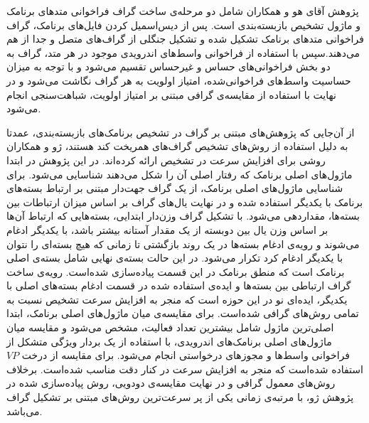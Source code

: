 پژوهش آقای هو و همکاران شامل دو مرحله‌ی ساخت گراف فراخوانی متد‌های‌ برنامک و ماژول تشخیص بازبسته‌بندی است. پس از دیس‌اسمیل کردن فایل‌های برنامک، گراف فراخوانی متد‌های برنامک تشکیل شده و تشکیل جنگلی از گراف‌های متصل و جدا از هم می‌دهند.سپس با استفاده از فراخوانی‌ واسط‌های اندرویدی موجود در هر متد، گراف به دو بخش فراخوانی‌های حساس‌ و غیرحساس‌ تقسیم می‌شود و با توجه به میزان حساسیت واسط‌های فراخوانی‌شده، امتیاز اولویت‌ به هر گراف نگاشت می‌شود و در نهایت با استفاده از مقایسه‌ی گرافی مبتنی بر امتیاز اولویت، شباهت‌سنجی انجام می‌شود.

از آن‌جایی که پژوهش‌های مبتنی بر گراف در تشخیص برنامک‌های بازبسته‌بندی، عمدتا به دلیل استفاده از روش‌های تشخیص گراف‌های همریخت کند هستند، ژو و همکاران  روشی برای افزایش سرعت در تشخیص ارائه کرده‌اند. در این پژوهش در ابتدا ماژول‌های اصلی برنامک که رفتار اصلی آن را شکل می‌دهند شناسایی می‌شود. برای شناسایی ماژول‌های اصلی برنامک، از یک گراف جهت‌دار مبتنی بر ارتباط بسته‌‌های برنامک با یکدیگر استفاده شده و در نهایت یال‌های گراف بر اساس میزان ارتباطات بین بسته‌ها، مقدار‌دهی می‌شود. با تشکیل گراف وزن‌دار ابتدایی، بسته‌هایی که ارتباط آن‌ها بر اساس وزن یال بین دو‌بسته از یک مقدار آستانه بیشتر باشد، با یکدیگر ادغام می‌شوند و رویه‌ی ادغام بسته‌ها در یک روند بازگشتی تا زمانی که هیچ بسته‌ای را نتوان با یکدیگر ادغام کرد تکرار می‌شود. در این حالت بسته‌ی نهایی شامل بسته‌ی اصلی برنامک است که منطق برنامک در این قسمت پیاده‌سازی شده‌است. رویه‌ی ساخت گراف ارتباطی بین بسته‌‌ها و ایده‌ی استفاده شده در قسمت ادغام بسته‌های اصلی با یکدیگر، ایده‌ای نو در این حوزه‌ است که منجر به افزایش سرعت تشخیص نسبت به تمامی روش‌های گرافی شده‌است. برای مقایسه‌ی میان ماژول‌های اصلی برنامک، ابتدا اصلی‌ترین ماژول شامل بیشترین تعداد فعالیت، مشخص می‌شود و مقایسه میان ماژول‌های اصلی برنامک‌های اندرویدی،‌ با استفاده از یک بردار ویژگی متشکل از فراخوانی‌ واسط‌ها و مجوز‌های‌ درخواستی انجام می‌شود. برای مقایسه از درخت $VP$‌ استفاده شده‌است که منجر به افزایش سرعت در کنار دقت مناسب شده‌است. برخلاف روش‌های معمول گرافی و در نهایت مقایسه‌ی دو‌دویی، روش پیاده‌سازی شده در پژوهش ژو، با مرتبه‌ی زمانی  یکی از پر سرعت‌ترین روش‌های مبتنی بر تشکیل گراف می‌باشد.

